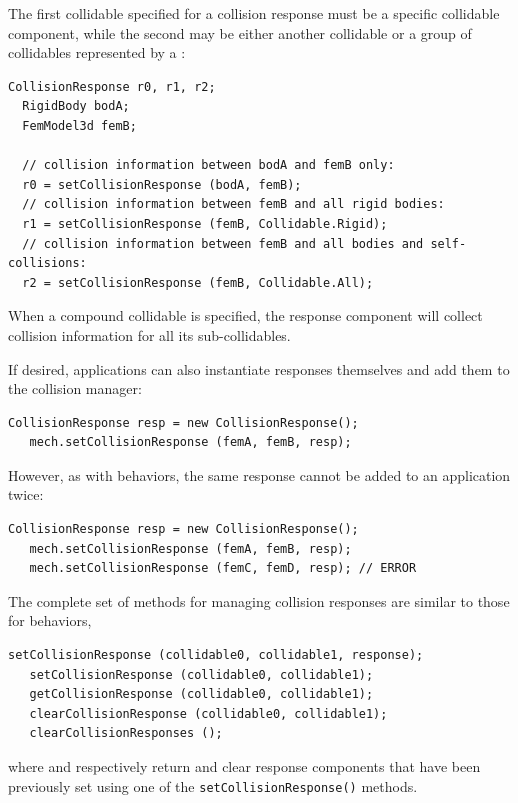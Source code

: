 The first collidable specified for a collision response
must be a specific collidable component, while the second may be either another
collidable or a group of collidables represented by a
:
%
\begin{lstlisting}[]
  CollisionResponse r0, r1, r2;
  RigidBody bodA;
  FemModel3d femB;

  // collision information between bodA and femB only:
  r0 = setCollisionResponse (bodA, femB); 
  // collision information between femB and all rigid bodies:
  r1 = setCollisionResponse (femB, Collidable.Rigid); 
  // collision information between femB and all bodies and self-collisions:
  r2 = setCollisionResponse (femB, Collidable.All); 
\end{lstlisting}
%
When a compound collidable is specified, the response component will
collect collision information for all its sub-collidables.

If desired, applications can also instantiate responses themselves and
add them to the collision manager:
%
\begin{lstlisting}[]
   CollisionResponse resp = new CollisionResponse();
   mech.setCollisionResponse (femA, femB, resp);
\end{lstlisting}
%
However, as with behaviors, the same response cannot be
added to an application twice:
%
\begin{lstlisting}[]
   CollisionResponse resp = new CollisionResponse();
   mech.setCollisionResponse (femA, femB, resp);
   mech.setCollisionResponse (femC, femD, resp); // ERROR
\end{lstlisting}
%

The complete set of methods for managing collision responses are
similar to those for behaviors,
%
\begin{lstlisting}[]
   setCollisionResponse (collidable0, collidable1, response);
   setCollisionResponse (collidable0, collidable1);
   getCollisionResponse (collidable0, collidable1);
   clearCollisionResponse (collidable0, collidable1);
   clearCollisionResponses ();
\end{lstlisting}
%
where
and
respectively return and clear response components that have been
previously set using one of the {\tt setCollisionResponse()} methods.

